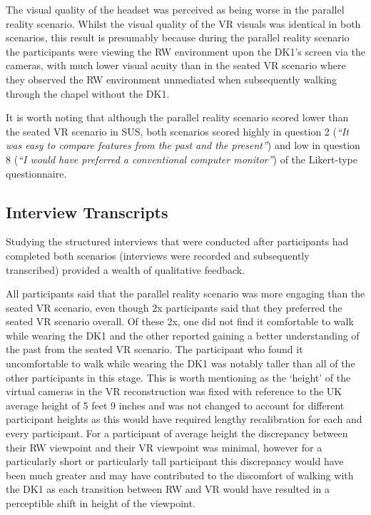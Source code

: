 The visual quality of the headset was perceived as being worse in the parallel reality scenario. Whilst the visual quality of the VR visuals was identical in both scenarios, this result is presumably because during the parallel reality scenario the participants were viewing the RW environment upon the DK1's screen via the cameras, with much lower visual acuity than in the seated VR scenario where they observed the RW environment unmediated when subsequently walking through the chapel without the DK1.

It is worth noting that although the parallel reality scenario scored lower than the seated VR scenario in SUS, both scenarios scored highly in question 2 (\textit{``It was easy to compare features from the past and the present''}) and low in question 8 (\textit{``I would have preferred a conventional computer monitor''}) of the Likert-type questionnaire.


\subsection{Interview Transcripts}

Studying the structured interviews that were conducted after participants had completed both scenarios (interviews were recorded and subsequently transcribed) provided a wealth of qualitative feedback.

All participants said that the parallel reality scenario was more engaging than the seated VR scenario, even though 2x participants said that they preferred the seated VR scenario overall. Of these 2x,  one did not find it comfortable to walk while wearing the DK1 and the other reported gaining a better understanding of the past from the seated VR scenario. The participant who found it uncomfortable to walk while wearing the DK1 was notably taller than all of the other participants in this stage. This is worth mentioning as the `height' of the virtual cameras in the VR reconstruction was fixed with reference to the UK average height of 5 feet 9 inches and was not changed to account for different participant heights as this would have required lengthy recalibration for each and every participant. For a participant of average height the discrepancy between their RW viewpoint and their VR viewpoint was minimal, however for a particularly short or particularly tall participant this discrepancy would have been much greater and may have contributed to the discomfort of walking with the DK1 as each transition between RW and VR would have resulted in a perceptible shift in height of the viewpoint.

